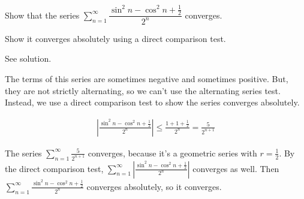 \begin{question}\label{nonalt2}
Show that the series
$\displaystyle\sum_{n=1}^\infty\dfrac{\sin^2 n - \cos^2 n+\tfrac12}{2^n}$ converges.
\end{question}
\begin{hint}
Show it converges absolutely using a direct comparison test.
\end{hint}
\begin{answer}
See solution.
\end{answer}
\begin{solution}
The terms of this series are sometimes negative and sometimes positive. But, they are not strictly alternating, so we can't use the alternating series test. Instead, we use a direct comparison test to show the series converges absolutely.

\begin{align*}
\left|\frac{\sin^2 n - \cos^2 n+\tfrac12}{2^n}\right| 
\le\frac{1 + 1 +\tfrac12}{2^n}
=\frac{5}{2^{n+1}}
\end{align*}

The series $\displaystyle\sum_{n=1}^\infty \frac{5}{2^{n+1}}$ converges, because it's a geometric series with $r=\frac{1}{2}$. By the direct comparison test,
$\displaystyle\sum_{n=1}^\infty \left|\frac{\sin^2 n - \cos^2 n+\tfrac12}{2^n}\right| $ converges as well. Then $\displaystyle\sum_{n=1}^\infty \frac{\sin^2 n - \cos^2 n+\tfrac12}{2^n}$ converges absolutely, so it converges.

\end{solution}



\subsection*{\Application}

